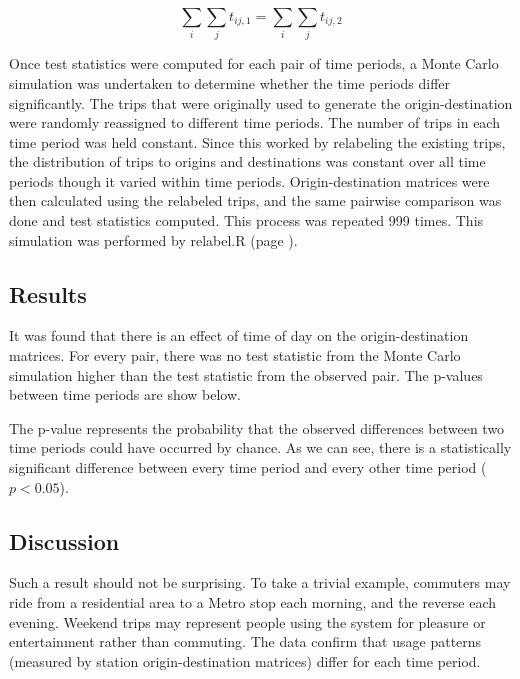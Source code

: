 \documentclass[letterpaper,11pt]{article}
\newcommand{\reflst}[1]{#1 (page \pageref{#1})}
\begin{document}
\begin{equation}\label{eq:timeconstraint}
  \displaystyle \sum_i \sum_j t_{ij,1} = \sum_i \sum_j t_{ij,2}
\end{equation}

Once test statistics were computed for each pair of time periods, a
Monte Carlo simulation was undertaken to determine whether the time
periods differ significantly. The trips that were originally used to
generate the origin-destination were randomly reassigned to different
time periods. The number of trips in each time period was held
constant. Since this worked by relabeling the existing trips, the
distribution of trips to origins and destinations was constant over
all time periods though it varied within time
periods. Origin-destination matrices were then calculated using the
relabeled trips, and the same pairwise comparison was done and test
statistics computed. This process was repeated 999 times. This
simulation was performed by \reflst{relabel.R}.

\subsection{Results}

It was found that there is an effect of time of day on the
origin-destination matrices. For every pair, there was no test
statistic from the Monte Carlo simulation higher than the test statistic
from the observed pair. The p-values between time periods are show below.

\noindent 

The p-value represents the probability that the observed differences
between two time periods could have occurred by chance. As we can see,
there is a statistically significant difference between every time
period and every other time period ($p < 0.05$).

\subsection{Discussion}

Such a result should not be surprising. To take a trivial example,
commuters may ride from a residential area to a Metro stop each
morning, and the reverse each evening. Weekend trips may represent
people using the system for pleasure or entertainment rather than
commuting. The data confirm that usage patterns (measured by station
origin-destination matrices) differ for each time period.
\end{document}
